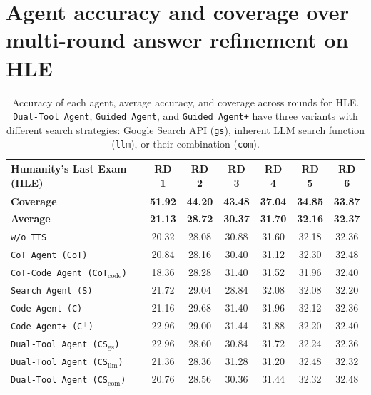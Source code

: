 \newpage
\section{Agent accuracy and coverage over multi-round answer refinement on HLE}
\label{appendix sec: agent accuracy evolution over rounds}

\begin{table}[ht]
\caption{Accuracy of each agent, average accuracy, and coverage across rounds for HLE. \texttt{Dual-Tool Agent}, \texttt{Guided Agent}, and \texttt{Guided Agent+} have three variants with different search strategies: Google Search API (\texttt{gs}), inherent LLM search function (\texttt{llm}), or their combination (\texttt{com}).}
\label{table: acc round evolution}
\centering
\renewcommand{\arraystretch}{1.3}
\setlength{\tabcolsep}{10pt}
\begin{tabular}{|>{\raggedright\arraybackslash}m{5cm}|c|c|c|c|c|c|}
\hline
\textbf{Humanity’s Last Exam (HLE)} & 
\textbf{RD 1} & 
\textbf{RD 2} & 
\textbf{RD 3} & 
\textbf{RD 4} &
\textbf{RD 5} &
\textbf{RD 6} \\
\hline
\textbf{Coverage} &
\textbf{51.92} & \textbf{44.20} & \textbf{43.48} & \textbf{37.04} & \textbf{34.85} & \textbf{33.87} \\
\hline
\textbf{Average} & \textbf{21.13} & \textbf{28.72} & \textbf{30.37} & \textbf{31.70} &
\textbf{32.16} &
\textbf{32.37} \\
\hline
\texttt{w/o TTS} & 20.32 & 28.08 & 30.88 & 31.60 & 32.18 & 32.36 \\
\hline
\texttt{CoT Agent (CoT)} & 20.84 & 28.16 & 30.40 & 31.12 & 32.30 & 32.48 \\
\hline
\texttt{CoT-Code Agent (CoT$_{\text{code}}$)} & 18.36 & 28.28 & 31.40 & 31.52 & 31.96 & 32.40 \\
\hline
\texttt{Search Agent (S)} & 21.72 & 29.04 & 28.84 & 32.08 & 32.08 & 32.20 \\
\hline
\texttt{Code Agent (C)} & 21.16 & 29.68 & 31.40 & 31.96 & 32.12 & 32.36 \\
\hline
\texttt{Code Agent+ (C$^{+}$)} & 22.96 & 29.00 & 31.44 & 31.88 & 32.20 & 32.40 \\
\hline
\texttt{Dual-Tool Agent (CS$_{\text{gs}}$)} & 22.96 & 28.60 & 30.84 & 31.72 & 32.24 & 32.36 \\
\hline
\texttt{Dual-Tool Agent (CS$_{\text{llm}}$)} & 21.36 & 28.36 & 31.28 & 31.20 & 32.48 & 32.32 \\
\hline
\texttt{Dual-Tool Agent (CS$_{\text{com}}$)} & 20.76 & 28.56 & 30.36 & 31.44 & 32.32 & 32.48 \\

\end{tabular}
\end{table}
